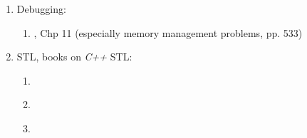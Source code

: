 \begin{enumerate}
\begin{enumerate}
	\item \cite[\S16.2--\S16.4]{Gaddis2012}
	\item \cite[pp. 13, 26--27, 33--34, 36, 62, 68, 1024]{Josuttis2012}
	\item \cite[\S16.2--\S16.4]{Gaddis2011}
	\item \cite[Chp. 17]{Savitch2009}
	\item \cite{Stroustrup2009}, Chp 19
	\item \cite[\S6.16, pp. 193--195]{Pozrikidis2007}
	\item \cite{Abrahams2005}, book
	\item \cite[pp. --]{Prata2005}
	\item \cite{Eckel2003}, Chp 3
	\item \cite{Oualline2003}, Chp 24
	\item \cite{Schildt2003}, Chp 18
	\item \cite[Chp. 16, pp. 375--394]{Schildt2003a}
	\item \cite{Vandevoorde2003}, book
	\item \cite{Alexandrescu2001}, book; typelist - Chp 3
	\item \cite{Vermeir2001}, Chp 6
	\item \cite{Eckel2000}, Chp 16
	\item \cite[Chp. 18, pp. 461--487]{Schildt1998a}
	\item References: \vspace{-0.2cm}
		\begin{enumerate} \itemsep -2pt
		\item 
		\item 
		\end{enumerate}
	\end{enumerate}
\item Debugging: \vspace{-0.3cm}
	\begin{enumerate} \itemsep -2pt
	\item \cite{Eckel2003}, Chp 11 (especially memory management problems, pp. 533)
	\end{enumerate}
\item STL, books on {\it C++} STL: \vspace{-0.3cm}
	\begin{enumerate} \itemsep -2pt
	\item \cite[\S16.5, 983--996]{Gaddis2012}
	\item \cite{Josuttis2012}
	\item \cite[Chp. 18, pp. 943--998]{Savitch2009}

\end{enumerate}
\end{enumerate}
